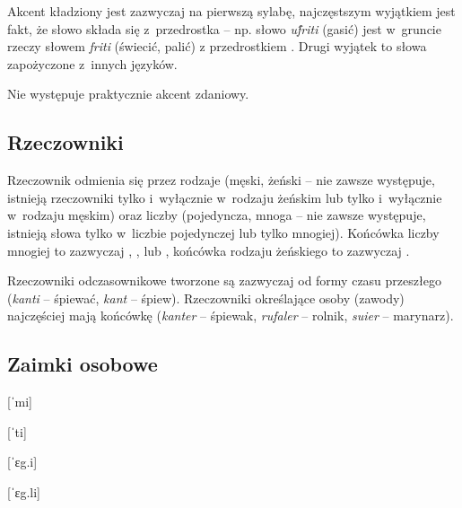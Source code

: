 \begin{spacing}{1.1}
    Akcent kładziony jest zazwyczaj na pierwszą sylabę, najczęstszym wyjątkiem jest
    fakt, że słowo składa się z~przedrostka -- np. słowo \emph{uf́riti}
     (gasić) jest w~gruncie rzeczy słowem \emph{friti} 
    (świecić, palić) z przedrostkiem . Drugi wyjątek to słowa zapożyczone
    z~innych języków.

    Nie występuje praktycznie akcent zdaniowy.

    \subsection{Rzeczowniki}
    Rzeczownik odmienia się przez rodzaje (męski, żeński -- nie zawsze występuje,
    istnieją rzeczowniki tylko i~wyłącznie w~rodzaju żeńskim lub tylko i~wyłącznie
    w~rodzaju męskim) oraz liczby (pojedyncza, mnoga -- nie zawsze występuje,
    istnieją słowa tylko w~liczbie pojedynczej lub tylko mnogiej). Końcówka liczby
    mnogiej to zazwyczaj , ,  lub , końcówka rodzaju
    żeńskiego to zazwyczaj .


    Rzeczowniki odczasownikowe tworzone są zazwyczaj od formy czasu przeszłego
    (\emph{kanti} -- śpiewać, \emph{kant} -- śpiew). Rzeczowniki określające osoby
    (zawody) najczęściej mają końcówkę  (\emph{kanter} -- śpiewak,
    \emph{rufaler} -- rolnik, \emph{suier} -- marynarz).

    \subsection{Zaimki osobowe}

    \begin{multicols}{2}

        [ˈmi]

        [ˈti]

        [ˈɛg.i]

        [ˈɛg.li]


\end{multicols}
\end{spacing}
